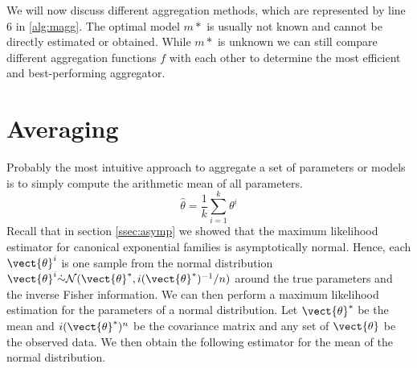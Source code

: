 We will now discuss different aggregation methods, which are represented by line 6 in \alg \ref{alg:magg}.
The optimal model $m*$ is usually not known and cannot be directly estimated or obtained.
While  $m*$ is unknown we can still compare different aggregation functions $f$ with each other to determine the most efficient and best-performing aggregator.


\section{Averaging}

Probably the most intuitive approach to aggregate a set of parameters or models is to simply compute the  arithmetic mean of all parameters.
\begin{equation}
    \label{eq:arithmean}
    \hat{\theta} = \frac{1}{k} \sum_{i=1}^k \theta^i
\end{equation}
Recall that in section \ref{ssec:asymp} we showed that the maximum likelihood estimator for canonical exponential families is asymptotically normal.
Hence, each $\vect{\theta}^i$ is one sample from the normal distribution $\vect{\theta}^i \dot{\sim} \mathcal{N}(\vect{\theta}^*, i(\vect{\theta}^*)^{-1}/n)$ around the true parameters and the inverse Fisher information.
We can then perform a maximum likelihood estimation for the parameters of a normal distribution. 
Let $\vect{\theta}^*$ be the mean and $i(\vect{\theta}^*)^n$ be the covariance matrix and any set of $\vect{\theta}$ be the observed data.
We then obtain the following estimator for the mean of the normal distribution.
